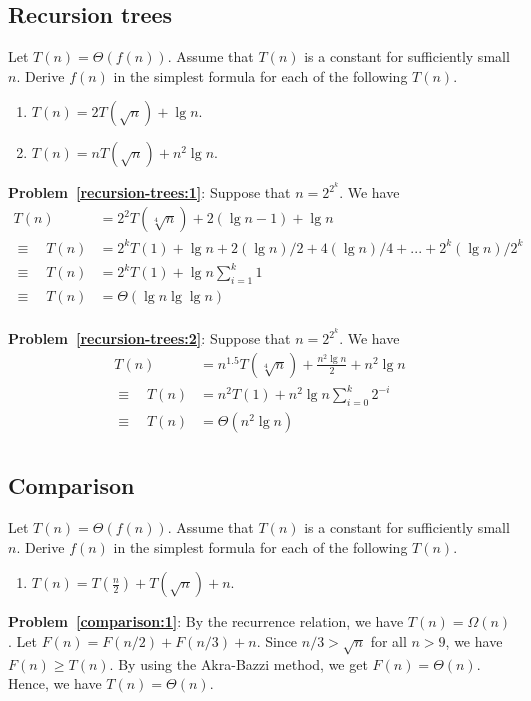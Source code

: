 \subsection{Recursion trees}
\begin{Exercise}
Let $T(n) = \Theta(f(n))$. Assume that $T(n)$ is a constant for sufficiently small $n$. Derive $f(n)$ in the simplest formula for each of the following $T(n)$.
\begin{enumerate}
\item $T(n) = 2T(\sqrt{n}) + \lg n$. \label{recursion-trees:1} 
\item $T(n) = nT(\sqrt{n}) + n^2 \lg n$. \label{recursion-trees:2} 
\end{enumerate}
\end{Exercise}
\begin{Answer}

{\bf Problem~\ref{recursion-trees:1}}: Suppose that $n = 2^{2^k}$. We have
\begin{align*}
T(n) &= 2^2T(\sqrt[4]{n}) + 2(\lg n - 1) + \lg n \\
\equiv \quad T(n) &= 2^k T(1) + \lg n + 2(\lg n)/2 + 4(\lg n)/4 + ... + 2^k(\lg n)/2^k \\
\equiv \quad T(n) &= 2^k T(1) + \lg n \sum_{i=1}^k 1 \\
\equiv \quad T(n) &= \Theta(\lg n \lg \lg n) \\
\end{align*}

{\bf Problem~\ref{recursion-trees:2}}: Suppose that $n = 2^{2^k}$. We have
\begin{align*}
T(n) &= n^{1.5}T(\sqrt[4]{n}) + \frac{n^2 \lg n}{2} + n^2 \lg n \\
\equiv \quad T(n) &= n^2 T(1) + n^2 \lg n \sum_{i=0}^k 2^{-i} \\
\equiv \quad T(n) &= \Theta(n^2 \lg n) \\
\end{align*}

\end{Answer}


\subsection{Comparison}
\begin{Exercise}
Let $T(n) = \Theta(f(n))$. Assume that $T(n)$ is a constant for sufficiently small $n$. Derive $f(n)$ in the simplest formula for each of the following $T(n)$.
\begin{enumerate}
\item $T(n) = T(\frac{n}{2}) + T(\sqrt{n}) + n$. \label{comparison:1} 
\end{enumerate}
\end{Exercise}
\begin{Answer}

{\bf Problem~\ref{comparison:1}}: By the recurrence relation, we have $T(n) = \Omega(n)$. Let $F(n) = F(n/2) + F(n/3) + n$. Since $n/3 >  \sqrt{n}$ for all $n > 9$, we have $F(n) \geq T(n)$.
By using the Akra\--Bazzi method, we get $F(n) = \Theta(n)$.
Hence, we have $T(n) = \Theta(n)$.
\end{Answer}

\printbibliography[heading=subbibliography]
